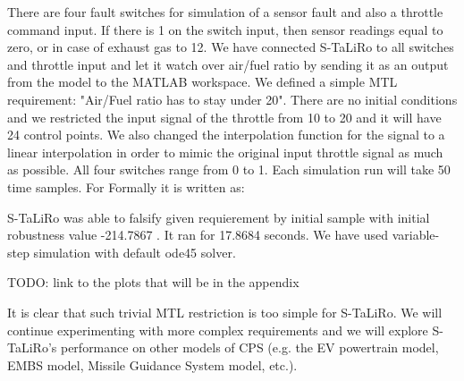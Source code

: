 There are four fault switches for simulation of a sensor fault and also a throttle command input. If there is 1 on the switch input, then sensor readings equal to zero, or in case of  exhaust gas to 12. We have connected S-TaLiRo to all switches and throttle input and let it watch over air/fuel ratio by sending it as an output from the model to the MATLAB workspace. We defined a simple MTL requirement: "Air/Fuel ratio has to stay under 20". There are no initial conditions and we restricted the input signal of the throttle from 10 to 20 and it will have 24 control points. We also changed the interpolation function for the signal to a linear interpolation in order to mimic the original input throttle signal as much as possible. All four switches range from 0 to 1. Each simulation run will take 50 time samples. For Formally it is written as:



S-TaLiRo was able to falsify given requierement by initial sample with initial robustness value -214.7867 \cite{Fainekos:RobustnessFinite}. It ran for 17.8684 seconds. We have used variable-step simulation with default ode45 solver.

TODO: link to the plots that will be in the appendix

It is clear that such trivial MTL restriction is too simple for S-TaLiRo. We will continue experimenting with more complex requirements and we will explore S-TaLiRo's performance on other models of CPS (e.g. the EV powertrain model, EMBS model, Missile Guidance System model, etc.).
